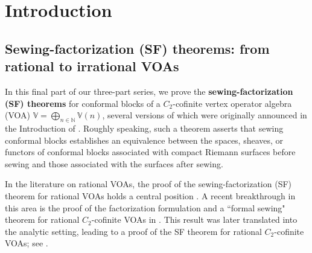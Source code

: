 \documentclass[11pt,b5paper,notitlepage]{article}
\theoremstyle{definition}
\theoremstyle{plain}
\newcommand{\Vbb}{\mathbb V}
\newcommand{\Nbb}{\mathbb N}
\newcommand{\<}{\left\langle}
\renewcommand{\>}{\right\rangle}
\numberwithin{equation}{section}
\begin{document}
\tableofcontents




	
	
	
	

	
	

	
	
	
	
	
	
	
	
	





\section{Introduction}

\nocite{HLZ1,HLZ2,HLZ3,HLZ4,HLZ5,HLZ6,HLZ7,HLZ8}

\subsection{Sewing-factorization (SF) theorems: from rational to irrational VOAs}

In this final part of our three-part series, we prove the \textbf{sewing-factorization (SF) theorems} for conformal blocks of a $C_2$-cofinite  vertex operator algebra (VOA) $\Vbb=\bigoplus_{n\in\Nbb}\Vbb(n)$, several versions of which were originally announced in the Introduction of \cite{GZ1}. Roughly speaking, such a theorem asserts that sewing conformal blocks establishes an equivalence between the spaces, sheaves, or functors of conformal blocks associated with compact Riemann surfaces before sewing and those associated with the surfaces after sewing. 

In the literature on rational VOAs, the proof of the sewing-factorization (SF) theorem for rational  VOAs holds a central position \cite{TUY,Zhu-modular-invariance,Hua-tensor-4,Hua-differential-genus-0,NT-P1_conformal_blocks,Hua-differential-genus-1}. A recent breakthrough in this area is the proof of the factorization formulation and a ``formal sewing" theorem for rational $C_2$-cofinite VOAs in \cite{DGT2}. This result was later translated into the analytic setting, leading to a proof of the SF theorem for rational $C_2$-cofinite VOAs; see \cite[Thm. 12.1]{Gui-sewingconvergence}. 
\end{document}
